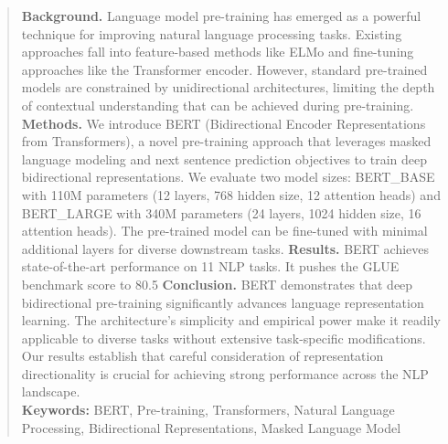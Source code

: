 \begin{abstract}
\textbf{Background.} Language model pre-training has emerged as a powerful technique for improving natural language processing tasks. Existing approaches fall into feature-based methods like ELMo and fine-tuning approaches like the Transformer encoder. However, standard pre-trained models are constrained by unidirectional architectures, limiting the depth of contextual understanding that can be achieved during pre-training.
\textbf{Methods.} We introduce BERT (Bidirectional Encoder Representations from Transformers), a novel pre-training approach that leverages masked language modeling and next sentence prediction objectives to train deep bidirectional representations. We evaluate two model sizes: BERT_BASE with 110M parameters (12 layers, 768 hidden size, 12 attention heads) and BERT_LARGE with 340M parameters (24 layers, 1024 hidden size, 16 attention heads). The pre-trained model can be fine-tuned with minimal additional layers for diverse downstream tasks.
\textbf{Results.} BERT achieves state-of-the-art performance on 11 NLP tasks. It pushes the GLUE benchmark score to 80.5%
\textbf{Conclusion.} BERT demonstrates that deep bidirectional pre-training significantly advances language representation learning. The architecture's simplicity and empirical power make it readily applicable to diverse tasks without extensive task-specific modifications. Our results establish that careful consideration of representation directionality is crucial for achieving strong performance across the NLP landscape.
\\
\textbf{Keywords:} BERT, Pre-training, Transformers, Natural Language Processing, Bidirectional Representations, Masked Language Model
\end{abstract}

